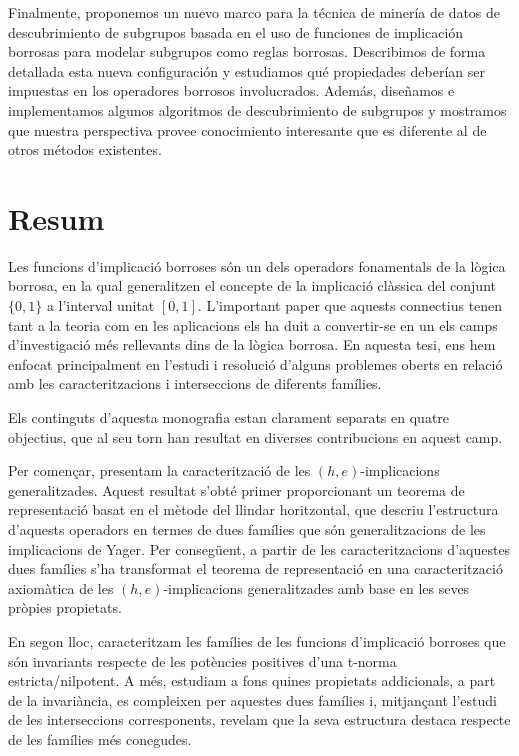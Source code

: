 Finalmente, proponemos un nuevo marco para la técnica de minería de datos de descubrimiento de subgrupos basada en el uso de funciones de implicación borrosas para modelar subgrupos como reglas borrosas. Describimos de forma detallada esta nueva configuración y estudiamos qué propiedades deberían ser impuestas en los operadores borrosos involucrados. Además, diseñamos e implementamos algunos algoritmos de descubrimiento de subgrupos y mostramos que nuestra perspectiva provee conocimiento interesante que es diferente al de otros métodos existentes.

\chapter*{Resum}

Les funcions d'implicació borroses són un dels operadors fonamentals de la lògica borrosa, en la qual generalitzen el concepte de la implicació clàssica del conjunt $\{0,1\}$ a l'interval unitat $[0,1]$. L'important paper que aquests connectius tenen tant a la teoria com en les aplicacions els ha duit a convertir-se en un els camps d'investigació més rellevants dins de la lògica borrosa. En aquesta tesi, ens hem enfocat principalment en l'estudi i resolució d'alguns problemes oberts en relació amb les caracteritzacions i interseccions de diferents famílies.

Els continguts d'aquesta monografia estan clarament separats en quatre objectius, que al seu torn han resultat en diverses contribucions en aquest camp.

Per començar, presentam la caracterització de les $(h,e)$-implicacions generalitzades. Aquest resultat s'obté primer proporcionant un teorema de representació basat en el mètode del llindar horitzontal, que descriu l'estructura d'aquests operadors en termes de dues famílies que són generalitzacions de les implicacions de Yager. Per consegüent, a partir de les caracteritzacions d'aquestes dues famílies s'ha transformat el teorema de representació en una caracterització axiomàtica de les $(h,e)$-implicacions generalitzades amb base en les seves pròpies propietats.


En segon lloc, caracteritzam les famílies de les funcions d'implicació borroses que són invariants respecte de les potències positives d'una t-norma estricta/nilpotent. A més, estudiam a fons quines propietats addicionals, a part de la invariància, es compleixen per aquestes dues famílies i, mitjançant l'estudi de les interseccions corresponents, revelam que la seva estructura destaca respecte de les famílies més conegudes.

